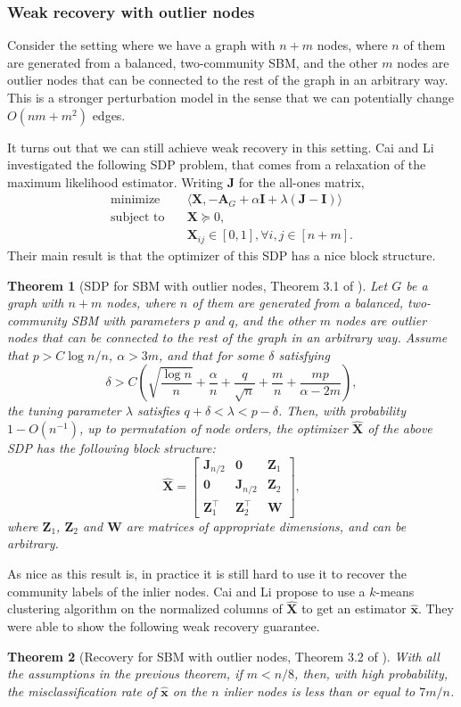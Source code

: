 \documentclass[11pt, titlepage]{article} %
\numberwithin{equation}{section}
\newtheorem{theorem}{Theorem}
\theoremstyle{definition}
\numberwithin{theorem}{section}
\numberwithin{lemma}{section}
\numberwithin{corollary}{section}
\numberwithin{proposition}{section}
\numberwithin{definition}{section}
\numberwithin{remark}{section}
\begin{document}
\subsubsection{Weak recovery with outlier nodes}
Consider the setting where we have a graph with $n + m$ nodes, where $n$ of them are generated
from a balanced, two-community SBM, and the other $m$ nodes are outlier nodes that can be connected
to the rest of the graph in an arbitrary way. This is a stronger perturbation model in the sense that
we can potentially change $O(nm + m^2)$ edges.

It turns out that we can still achieve weak recovery in this setting. Cai and Li \cite{CL15} 
investigated the following SDP problem, that comes from a relaxation of the maximum likelihood estimator. 
Writing $\bm{J}$ for the all-ones matrix,
\begin{align*}
\text{minimize} \quad & \langle \bm{X}, -\bm{A}_G + \alpha \bm{I} + \lambda (\bm{J} - \bm{I}) \rangle\\
\text{subject to} \quad & \bm{X} \succeq 0, \\
& \bm{X}_{ij} \in [0,1], \forall i,j \in [n+m].
\end{align*}
Their main result is that the optimizer of this SDP has a nice block structure.
\begin{theorem}[SDP for SBM with outlier nodes, Theorem 3.1 of \cite{CL15}]
Let $G$ be a graph with $n + m$ nodes, where $n$ of them are generated from a balanced, two-community
SBM with parameters $p$ and $q$, and the other $m$ nodes are outlier nodes that can be connected to 
the rest of the graph in an arbitrary way. Assume that $p > C\log n / n$, $\alpha > 3m$, and that for
some $\delta$ satisfying
\[
\delta > C\left(\sqrt{\frac{\log n}{n}} + \frac{\alpha}{n} + \frac{q}{\sqrt{n}} + \frac{m}{n}
+ \frac{mp}{\alpha - 2m}\right),
\]
the tuning parameter $\lambda$ satisfies $q + \delta < \lambda < p - \delta$. Then, with probability
$1 - O(n^{-1})$, up to permutation of node orders, the optimizer $\hat{\bm{X}}$ of the above SDP has
the following block structure:
\[
\hat{\bm{X}} = \begin{bmatrix} 
  \bm{J}_{n/2} & \bm{0} & \bm{Z}_1\\
  \bm{0} & \bm{J}_{n/2} & \bm{Z}_2\\
  \bm{Z}_1^\top & \bm{Z}_2^\top & \bm{W}
\end{bmatrix},
\]
where $\bm{Z}_1$, $\bm{Z}_2$ and $\bm{W}$ are matrices of appropriate dimensions, and can be arbitrary.
\end{theorem}
As nice as this result is, in practice it is still hard to use it to recover the community labels 
of the inlier nodes. Cai and Li propose to use a $k$-means clustering algorithm on the normalized
columns of $\hat{\bm{X}}$ to get an estimator $\hat{\bm{x}}$. They were able to show the following
weak recovery guarantee.
\begin{theorem}[Recovery for SBM with outlier nodes, Theorem 3.2 of \cite{CL15}]
With all the assumptions in the previous theorem, if $m < n/8$, then, with high probability, 
the misclassification rate of $\hat{\bm{x}}$ on the $n$ inlier nodes is less than or equal to $7m/n$.
\end{theorem}
\end{document}
